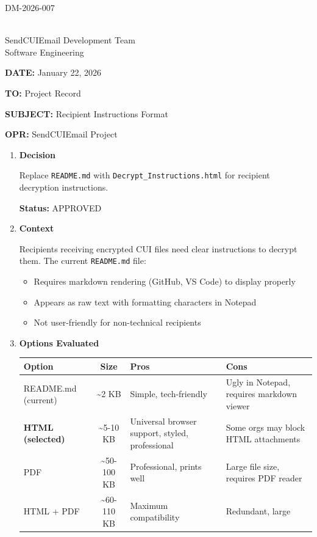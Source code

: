 \documentclass[11pt,letterpaper]{article}
\newcommand{\UniqueID}{DM-2026-007}
\newcommand{\DocumentDate}{January 22, 2026}
\newcommand{\AuthorName}{SendCUIEmail Development Team}
\newcommand{\AuthorTitle}{Software Engineering}
\newcommand{\ToField}{Project Record}
\newcommand{\SubjectField}{Recipient Instructions Format}
\newcommand{\OPRField}{SendCUIEmail Project}
\newcommand{\dmsection}[1]{\item \textbf{#1}\par}
\begin{document}
\hfill \UniqueID

\vspace{0.25in}

\underline{\hspace{2.5in}}\\[2pt]
\AuthorName\\
\AuthorTitle

\vspace{0.25in}

\textbf{DATE:} \DocumentDate

\textbf{TO:} \ToField

\textbf{SUBJECT:} \SubjectField

\textbf{OPR:} \OPRField

\vspace{0.25in}

\begin{enumerate}

\dmsection{Decision}

Replace \texttt{README.md} with \texttt{Decrypt\_Instructions.html} for recipient decryption instructions.

\textbf{Status:} \textcolor{passgreen}{APPROVED}

\dmsection{Context}

Recipients receiving encrypted CUI files need clear instructions to decrypt them. The current \texttt{README.md} file:
\begin{itemize}
    \item Requires markdown rendering (GitHub, VS Code) to display properly
    \item Appears as raw text with formatting characters in Notepad
    \item Not user-friendly for non-technical recipients
\end{itemize}

\dmsection{Options Evaluated}

\begin{tabularx}{\textwidth}{l c X X}
\toprule
\textbf{Option} & \textbf{Size} & \textbf{Pros} & \textbf{Cons} \\
\midrule
README.md (current) & \textasciitilde2 KB & Simple, tech-friendly & Ugly in Notepad, requires markdown viewer \\
\textbf{HTML (selected)} & \textasciitilde5-10 KB & Universal browser support, styled, professional & Some orgs may block HTML attachments \\
PDF & \textasciitilde50-100 KB & Professional, prints well & Large file size, requires PDF reader \\
HTML + PDF & \textasciitilde60-110 KB & Maximum compatibility & Redundant, large \\
\bottomrule
\end{tabularx}


\end{enumerate}
\end{document}
